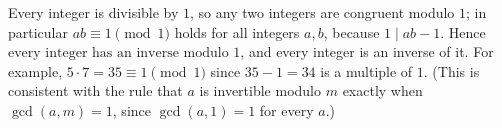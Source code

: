 Every integer is divisible by $1$, so any two integers are congruent modulo $1$; in particular $ab\equiv1\pmod1$ holds for all integers $a,b$, because $1\mid ab-1$. Hence $\boxed{\text{every integer has an inverse modulo }1}$, and every integer is an inverse of it. For example, $5\cdot7=35\equiv1\pmod1$ since $35-1=34$ is a multiple of $1$. (This is consistent with the rule that $a$ is invertible modulo $m$ exactly when $\gcd(a,m)=1$, since $\gcd(a,1)=1$ for every $a$.)
